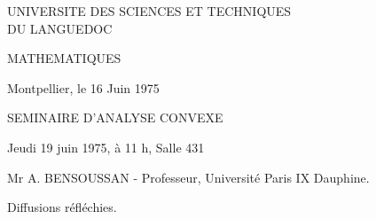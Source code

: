 UNIVERSITE DES SCIENCES ET TECHNIQUES\\
DU LANGUEDOC

MATHEMATIQUES

Montpellier, le 16 Juin 1975

SEMINAIRE D'ANALYSE CONVEXE

Jeudi 19 juin 1975, à 11 h, Salle 431

Mr A. BENSOUSSAN - Professeur, Université Paris IX Dauphine.

Diffusions réfléchies.
